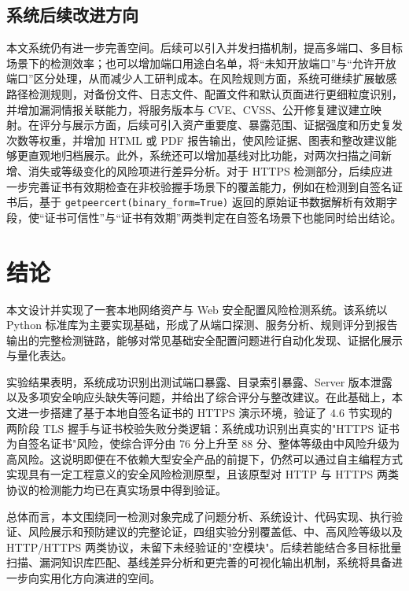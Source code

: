 \documentclass[12pt,a4paper,fontset=none]{ctexart}
\begin{document}
\subsection{系统后续改进方向}

本文系统仍有进一步完善空间。后续可以引入并发扫描机制，提高多端口、多目标场景下的检测效率；也可以增加端口用途白名单，将“未知开放端口”与“允许开放端口”区分处理，从而减少人工研判成本。在风险规则方面，系统可继续扩展敏感路径检测规则，对备份文件、日志文件、配置文件和默认页面进行更细粒度识别，并增加漏洞情报关联能力，将服务版本与 CVE、CVSS、公开修复建议建立映射。在评分与展示方面，后续可引入资产重要度、暴露范围、证据强度和历史复发次数等权重，并增加 HTML 或 PDF 报告输出，使风险证据、图表和整改建议能够更直观地归档展示。此外，系统还可以增加基线对比功能，对两次扫描之间新增、消失或等级变化的风险项进行差异分析。对于 HTTPS 检测部分，后续应进一步完善证书有效期检查在非校验握手场景下的覆盖能力，例如在检测到自签名证书后，基于 \texttt{getpeercert(binary\_form=True)} 返回的原始证书数据解析有效期字段，使“证书可信性”与“证书有效期”两类判定在自签名场景下也能同时给出结论。

\section{结论}

本文设计并实现了一套本地网络资产与 Web 安全配置风险检测系统。该系统以 Python 标准库为主要实现基础，形成了从端口探测、服务分析、规则评分到报告输出的完整检测链路，能够对常见基础安全配置问题进行自动化发现、证据化展示与量化表达。

实验结果表明，系统成功识别出测试端口暴露、目录索引暴露、Server 版本泄露以及多项安全响应头缺失等问题，并给出了综合评分与整改建议。在此基础上，本文进一步搭建了基于本地自签名证书的 HTTPS 演示环境，验证了 4.6 节实现的两阶段 TLS 握手与证书校验失败分类逻辑：系统成功识别出真实的"HTTPS 证书为自签名证书"风险，使综合评分由 76 分上升至 88 分、整体等级由中风险升级为高风险。这说明即便在不依赖大型安全产品的前提下，仍然可以通过自主编程方式实现具有一定工程意义的安全风险检测原型，且该原型对 HTTP 与 HTTPS 两类协议的检测能力均已在真实场景中得到验证。

总体而言，本文围绕同一检测对象完成了问题分析、系统设计、代码实现、执行验证、风险展示和预防建议的完整论证，四组实验分别覆盖低、中、高风险等级以及 HTTP/HTTPS 两类协议，未留下未经验证的"空模块"。后续若能结合多目标批量扫描、漏洞知识库匹配、基线差异分析和更完善的可视化输出机制，系统将具备进一步向实用化方向演进的空间。
\end{document}
